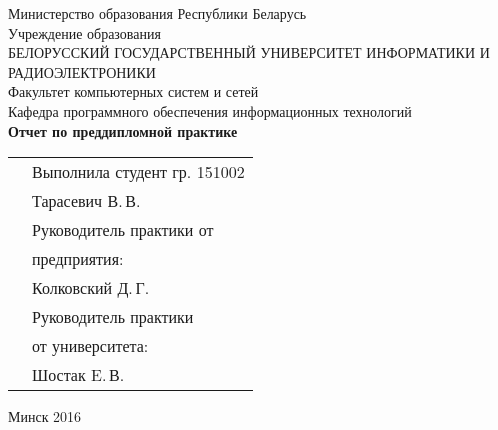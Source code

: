 \begin{titlepage}
    
    \begin{center}
        Министерство образования Республики Беларусь \\[0.4cm] 

        Учреждение образования \\

        \MakeUppercase{БЕЛОРУССКИЙ ГОСУДАРСТВЕННЫЙ УНИВЕРСИТЕТ ИНФОРМАТИКИ И РАДИОЭЛЕКТРОНИКИ} \\[0.4cm]

        Факультет компьютерных систем и сетей \\[0.4cm]

        Кафедра программного обеспечения информационных технологий \\[3.4cm] %

        {\large\bfseries{Отчет по преддипломной практике}} \\[2cm]

        \noindent
        \begin{tabular}{p{}p{}}
            & Выполнила студент гр. 151002 \\
            & Тарасевич В.\,В. \\[1cm]

            & Руководитель практики от \\
            & предприятия: \\
            & Колковский Д.\,Г. \\[1cm]

            & Руководитель практики \\
            & от университета: \\
            & Шостак E.\,В. \\
        \end{tabular}

        \vfill

        {\normalsize Минск 2016}
    \end{center}

\end{titlepage}
